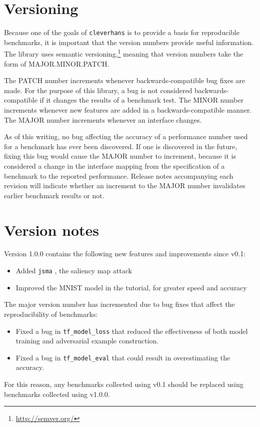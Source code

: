 \section{Versioning}
\label{sec:version}

Because one of the goals of \texttt{cleverhans} is to provide a basis for
reproducible benchmarks, it is important that the version numbers provide useful
information. The library uses semantic
versioning,\footnote{\url{http://semver.org/}} meaning that version numbers take
the form of MAJOR.MINOR.PATCH.

The PATCH number increments whenever backwards-compatible bug fixes are made.
For the purpose of this library, a bug is not considered backwards-compatible if
it changes the results of a benchmark test. The MINOR number increments whenever
new features are added in a backwards-compatible manner. The MAJOR number
increments whenever an interface changes.

As of this writing, no bug affecting the accuracy of a performance number used
for a benchmark has ever been discovered. If one is discovered in the future,
fixing this bug would cause the MAJOR number to increment, because it is
considered a change in the interface mapping from the specification of a
benchmark to the reported performance. Release notes accompanying each revision
will indicate whether an increment to the MAJOR number invalidates earlier
benchmark results or not.

\section{Version notes}

Version 1.0.0 contains the following new features and improvements since v0.1:
\begin{itemize}
\item  Added {\tt jsma} , the saliency map attack
\item Improved the MNIST model in the tutorial, for greater speed and accuracy
\end{itemize}

The major version number has incremented due to bug fixes that affect the reproducibility of benchmarks:
\begin{itemize}
\item Fixed a bug in {\tt tf\_model\_loss} that reduced the effectiveness of both model training and adversarial example construction.
\item Fixed a bug in {\tt tf\_model\_eval} that could result in overestimating the accuracy.
\end{itemize}
For this reason, any benchmarks collected using v0.1 should be replaced using benchmarks
collected using v1.0.0.
